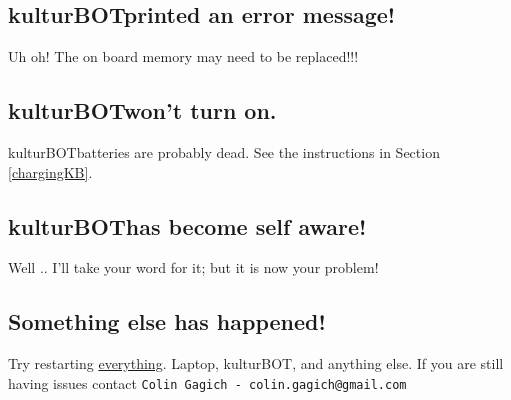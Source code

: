 \documentclass[]{article}
\newcommand{\kb}{kulturBOT}
\newcommand{\kbspace}{\kb \space}
\begin{document}
\subsection{\kbspace printed an error message!}
Uh oh! The on board memory may need to be replaced!!!
\subsection{\kbspace won't turn on.}
\kbspace batteries are probably dead. See the instructions in Section \ref{chargingKB}.
\subsection{\kbspace has become self aware!}
Well .. I'll take your word for it; but it is now your problem!
\subsection{Something else has happened!}
Try restarting \underline{everything}. Laptop, \kb, and anything else. If you are still having issues contact \texttt{Colin Gagich - colin.gagich@gmail.com}
\end{document}
